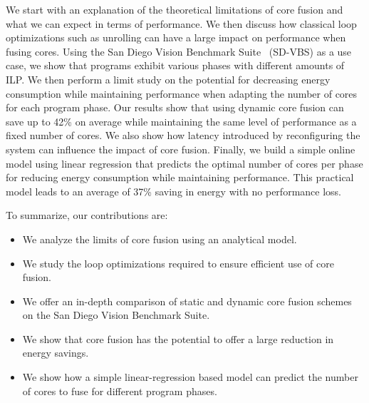 We start with an explanation of the theoretical limitations of core fusion and what we can expect in terms of performance.
We then discuss how classical loop optimizations such as unrolling can have a large impact on performance when fusing cores.
Using the San Diego Vision Benchmark Suite~\cite{sdvbs} (SD-VBS) as a use case, we show that programs exhibit various phases with different amounts of ILP.
We then perform a limit study on the potential for decreasing energy consumption while maintaining performance when adapting the number of cores for each program phase.
Our results show that using dynamic core fusion can save up to 42\% on average while maintaining the same level of performance as a fixed number of cores.
We also show how latency introduced by reconfiguring the system can influence the impact of core fusion.
Finally, we build a simple online model using linear regression that predicts the optimal number of cores per phase for reducing energy consumption while maintaining performance.
This practical model leads to an average of 37\% saving in energy with no performance loss.

To summarize, our contributions are:

\begin{itemize}
\item We analyze the limits of core fusion using an analytical model.
\item We study the loop optimizations required to ensure efficient use of core fusion.
\item We offer an in-depth comparison of static and dynamic core fusion schemes on the San Diego Vision Benchmark Suite.
\item We show that core fusion has the potential to offer a large reduction in energy savings.
\item We show how a simple linear-regression based model can predict the number of cores to fuse for different program phases.
\end{itemize}

